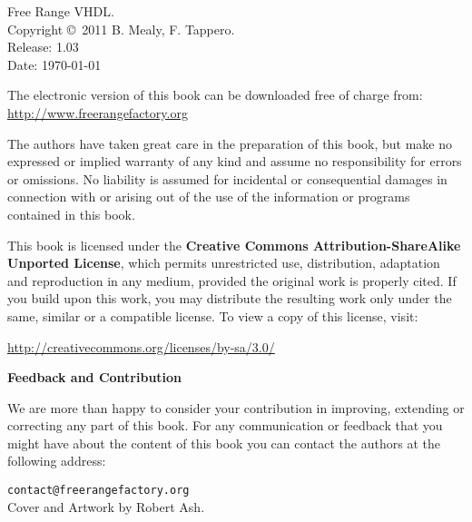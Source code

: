%
%
%
\setcounter{page}{1}

\small
\noindent
Free Range VHDL.\\
Copyright \copyright \ 2011 B. Mealy, F. Tappero.\\
Release: 1.03\\
Date: \today
\vspace{20pt}

\noindent
The electronic version of this book can be downloaded free of charge from:\\ 
\url{http://www.freerangefactory.org}\\

\vspace{20pt}

\noindent
The authors have taken great care in the preparation of this book, but make no expressed or implied warranty of any kind and assume no responsibility for errors or omissions. No liability is assumed for incidental or consequential damages in connection with or arising out of the use of the information or programs contained in this book.

\noindent
This book is licensed under the \textbf{Creative Commons Attribution-ShareAlike Unported License}, which permits unrestricted use, distribution, adaptation and reproduction in any medium, provided the original work is properly cited. If you build upon this work, you may distribute the resulting work only under the same, similar or a compatible license. To view a copy of this license, visit:
\vspace{5pt}

\noindent
\url{http://creativecommons.org/licenses/by-sa/3.0/}
\vspace{20pt}

\noindent
{\sffamily\bfseries Feedback and Contribution}

\noindent
We are more than happy to consider your contribution in improving, extending or correcting any part of this book.
For any communication or feedback that you might have about the content of this book you can contact the authors at the following address:
\vspace{2pt}

\noindent
\texttt{contact@freerangefactory.org}\\

\vfill
\noindent
Cover and Artwork by Robert Ash.


